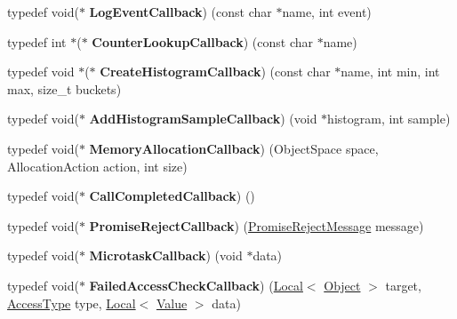 \begin{DoxyCompactItemize}
\item 
\hypertarget{namespacev8_a1516c6948fdca41f79410b7ff91aeaf0}{}typedef void($\ast$ {\bfseries Log\+Event\+Callback}) (const char $\ast$name, int event)\label{namespacev8_a1516c6948fdca41f79410b7ff91aeaf0}

\item 
\hypertarget{namespacev8_a5efca05a9f1f278a4eec832ce419104f}{}typedef int $\ast$($\ast$ {\bfseries Counter\+Lookup\+Callback}) (const char $\ast$name)\label{namespacev8_a5efca05a9f1f278a4eec832ce419104f}

\item 
\hypertarget{namespacev8_aafbf15734701792a14c02dbca7535b75}{}typedef void $\ast$($\ast$ {\bfseries Create\+Histogram\+Callback}) (const char $\ast$name, int min, int max, size\+\_\+t buckets)\label{namespacev8_aafbf15734701792a14c02dbca7535b75}

\item 
\hypertarget{namespacev8_a5a7c6bb8050ad84f0a453056ec325d1c}{}typedef void($\ast$ {\bfseries Add\+Histogram\+Sample\+Callback}) (void $\ast$histogram, int sample)\label{namespacev8_a5a7c6bb8050ad84f0a453056ec325d1c}

\item 
\hypertarget{namespacev8_a2402a6535cafc5f721192b300502fb0a}{}typedef void($\ast$ {\bfseries Memory\+Allocation\+Callback}) (Object\+Space space, Allocation\+Action action, int size)\label{namespacev8_a2402a6535cafc5f721192b300502fb0a}

\item 
\hypertarget{namespacev8_a8d88696ff21bd777d488605cb7714573}{}typedef void($\ast$ {\bfseries Call\+Completed\+Callback}) ()\label{namespacev8_a8d88696ff21bd777d488605cb7714573}

\item 
\hypertarget{namespacev8_a3367f6ae375d6d4b4b3f992953c135ba}{}typedef void($\ast$ {\bfseries Promise\+Reject\+Callback}) (\hyperlink{classv8_1_1PromiseRejectMessage}{Promise\+Reject\+Message} message)\label{namespacev8_a3367f6ae375d6d4b4b3f992953c135ba}

\item 
\hypertarget{namespacev8_a64445c32058729cdc44d56ff13458bed}{}typedef void($\ast$ {\bfseries Microtask\+Callback}) (void $\ast$data)\label{namespacev8_a64445c32058729cdc44d56ff13458bed}

\item 
\hypertarget{namespacev8_a1352a0d6e487b7092ea79e2d3d4ecd12}{}typedef void($\ast$ {\bfseries Failed\+Access\+Check\+Callback}) (\hyperlink{classv8_1_1Local}{Local}$<$ \hyperlink{classv8_1_1Object}{Object} $>$ target, \hyperlink{namespacev8_add8bef6469c5b94706584124e610046c}{Access\+Type} type, \hyperlink{classv8_1_1Local}{Local}$<$ \hyperlink{classv8_1_1Value}{Value} $>$ data)\label{namespacev8_a1352a0d6e487b7092ea79e2d3d4ecd12}


\end{DoxyCompactItemize}
